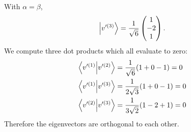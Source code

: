\documentclass[11pt]{article}
\begin{document}
\begin{enumerate}[label=(\alph*)]
    With $\alpha = \beta$,
    \[\ket{v^{\prime(3)}} = \frac{1}{\sqrt{6}}\begin{pmatrix}
        1 \\ -2 \\ 1
    \end{pmatrix}.\]
    We compute three dot products which all evaluate to zero:
    \begin{align*}
        \bra{v^{\prime(1)}}\ket{v^{\prime(2)}} &= \frac{1}{\sqrt{6}}(1 + 0 - 1) = 0\\
        \bra{v^{\prime(1)}}\ket{v^{\prime(3)}} &= \frac{1}{2\sqrt{3}}(1 + 0 - 1) = 0\\
        \bra{v^{\prime(2)}}\ket{v^{\prime(3)}} &= \frac{1}{3\sqrt{2}}(1 - 2 + 1) = 0
    \end{align*}
    Therefore the eigenvectors are orthogonal to each other.
\end{enumerate}
\end{document}
